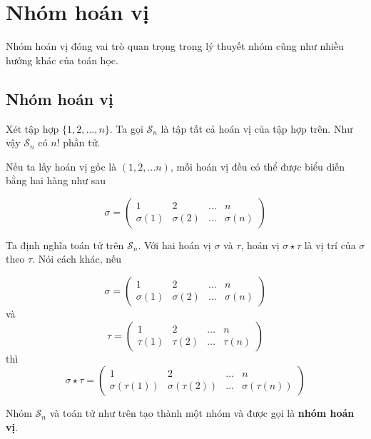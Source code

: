 \chapter{Nhóm hoán vị}

Nhóm hoán vị đóng vai trò quan trọng trong lý thuyết nhóm cũng như nhiều hướng
khác của toán học.

\section{Nhóm hoán vị}

Xét tập hợp $\{ 1, 2, \ldots, n \}$. Ta gọi $\mathcal{S}_n$ là tập tất cả hoán vị 
của tập hợp trên. Như vậy $\mathcal{S}_n$ có $n!$ phần tử.

Nếu ta lấy hoán vị gốc là $(1, 2, 
\ldots n)$, mỗi hoán vị đều có thể được biểu diễn bằng hai hàng như sau

\begin{equation}
    \sigma = \begin{pmatrix}
        1 & 2 & \ldots & n \\
        \sigma(1) & \sigma(2) & \ldots & \sigma(n)
    \end{pmatrix}
\end{equation}

Ta định nghĩa toán tử trên $\mathcal{S}_n$. Với hai hoán vị $\sigma$ và $\tau$,
hoán vị $\sigma \star \tau$ là vị trí của $\sigma$ theo $\tau$. Nói cách
khác, nếu 

\[\sigma = \begin{pmatrix}
    1 & 2 & \ldots & n \\
    \sigma(1) & \sigma(2) & \ldots & \sigma(n)
\end{pmatrix}\] và 
\[\tau = \begin{pmatrix}
    1 & 2 & \ldots & n \\
    \tau(1) & \tau(2) & \ldots & \tau(n)
\end{pmatrix}\] thì 
\[\sigma \star \tau =
\begin{pmatrix}
    1 & 2 & \ldots & n \\
    \sigma(\tau(1)) & \sigma(\tau(2)) & \ldots & \sigma(\tau(n))   
\end{pmatrix}\]

Nhóm $\mathcal{S}_n$ và toán tử như trên tạo thành một nhóm và được gọi là
\textbf{nhóm hoán vị}.

